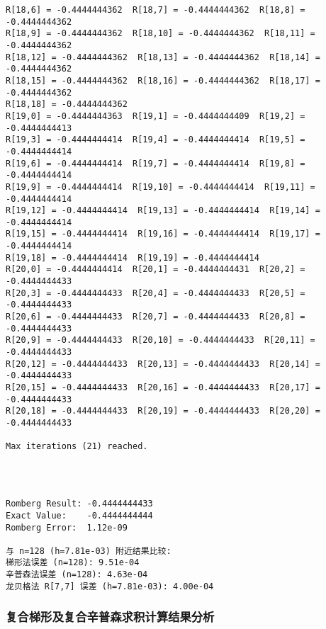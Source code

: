 \documentclass[11pt]{article}
\begin{document}
\begin{Verbatim}[commandchars=\\\{\}]
R[18,6] = -0.4444444362  R[18,7] = -0.4444444362  R[18,8] = -0.4444444362
R[18,9] = -0.4444444362  R[18,10] = -0.4444444362  R[18,11] = -0.4444444362
R[18,12] = -0.4444444362  R[18,13] = -0.4444444362  R[18,14] = -0.4444444362
R[18,15] = -0.4444444362  R[18,16] = -0.4444444362  R[18,17] = -0.4444444362
R[18,18] = -0.4444444362
R[19,0] = -0.4444444363  R[19,1] = -0.4444444409  R[19,2] = -0.4444444413
R[19,3] = -0.4444444414  R[19,4] = -0.4444444414  R[19,5] = -0.4444444414
R[19,6] = -0.4444444414  R[19,7] = -0.4444444414  R[19,8] = -0.4444444414
R[19,9] = -0.4444444414  R[19,10] = -0.4444444414  R[19,11] = -0.4444444414
R[19,12] = -0.4444444414  R[19,13] = -0.4444444414  R[19,14] = -0.4444444414
R[19,15] = -0.4444444414  R[19,16] = -0.4444444414  R[19,17] = -0.4444444414
R[19,18] = -0.4444444414  R[19,19] = -0.4444444414
R[20,0] = -0.4444444414  R[20,1] = -0.4444444431  R[20,2] = -0.4444444433
R[20,3] = -0.4444444433  R[20,4] = -0.4444444433  R[20,5] = -0.4444444433
R[20,6] = -0.4444444433  R[20,7] = -0.4444444433  R[20,8] = -0.4444444433
R[20,9] = -0.4444444433  R[20,10] = -0.4444444433  R[20,11] = -0.4444444433
R[20,12] = -0.4444444433  R[20,13] = -0.4444444433  R[20,14] = -0.4444444433
R[20,15] = -0.4444444433  R[20,16] = -0.4444444433  R[20,17] = -0.4444444433
R[20,18] = -0.4444444433  R[20,19] = -0.4444444433  R[20,20] = -0.4444444433

Max iterations (21) reached.
    \end{Verbatim}

    \begin{center}
    \end{center}
    { \hspace*{\fill} \\}
    
    \begin{Verbatim}[commandchars=\\\{\}]

Romberg Result: -0.4444444433
Exact Value:    -0.4444444444
Romberg Error:  1.12e-09

与 n=128 (h=7.81e-03) 附近结果比较:
梯形法误差 (n=128): 9.51e-04
辛普森法误差 (n=128): 4.63e-04
龙贝格法 R[7,7] 误差 (h=7.81e-03): 4.00e-04
    \end{Verbatim}

    \subsubsection{复合梯形及复合辛普森求积计算结果分析}\label{ux590dux5408ux68afux5f62ux53caux590dux5408ux8f9bux666eux68eeux6c42ux79efux8ba1ux7b97ux7ed3ux679cux5206ux6790}
\end{document}
